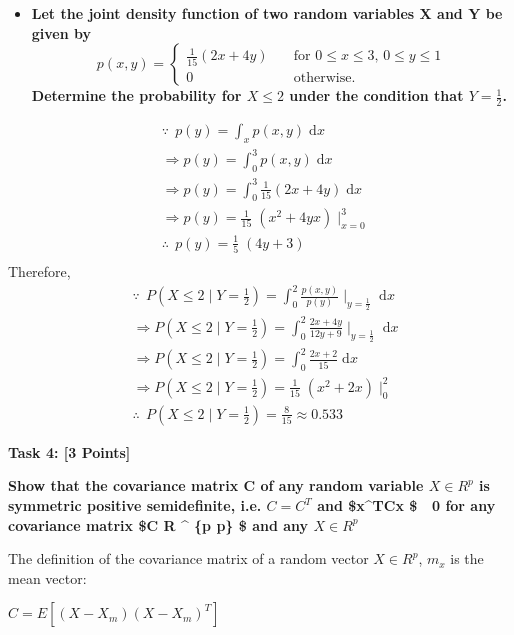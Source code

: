 \documentclass[11pt]{article}
\providecommand{\tightlist}{%
      \setlength{\itemsep}{0pt}\setlength{\parskip}{0pt}}
\begin{document}
    \begin{itemize}
\tightlist
\item
  \textbf{Let the joint density function of two random variables X and Y
  be given by} \[
  p(x, y) = \begin{cases}
  \frac{1}{15}(2x+4y) & \quad \text{for } 0\leq x\leq 3\text{, } 0\leq y\leq 1 \\
  0 & \quad \text{otherwise.} \end{cases}
  \] \textbf{Determine the probability for \(X\leq 2\) under the
  condition that \(Y = \frac{1}{2}\).}
\end{itemize}

    \[
\begin{align*}
& \because \,\; p(y) = \int_x p(x, y)\; \mathrm{d}x\\
& \Rightarrow p(y) = \int_0^3 p(x, y)\; \mathrm{d}x\\
& \Rightarrow p(y) = \int_0^3 \frac{1}{15}(2x+4y)\; \mathrm{d}x\\
& \Rightarrow p(y) = \frac{1}{15}\; (x^2+4yx)\mid_{x=0}^3\\
& \therefore \,\; p(y) = \frac{1}{5}\; (4y+3)\\
\end{align*}
\] Therefore, \[
\begin{align*}
& \because \,\; P(X\leq 2\mid Y=\frac{1}{2}) = \int_0^2 \frac{p(x, y)}{p(y)}\mid_{y=\frac{1}{2}}\; \mathrm{d}x\\
& \Rightarrow P(X\leq 2\mid Y=\frac{1}{2}) = \int_0^2 \frac{2x+4y}{12y+9}\mid_{y=\frac{1}{2}}\; \mathrm{d}x\\
& \Rightarrow P(X\leq 2\mid Y=\frac{1}{2}) = \int_0^2 \frac{2x+2}{15}\; \mathrm{d}x\\
& \Rightarrow P(X\leq 2\mid Y=\frac{1}{2}) = \frac{1}{15}\; (x^2+2x)\mid_0^2\\
& \therefore \,\; P(X\leq 2\mid Y=\frac{1}{2}) = \frac{8}{15} \approx 0.533
\end{align*}
\]

    \textbf{Task 4: {[}3 Points{]}}

\textbf{Show that the covariance matrix C of any random variable
\(X \in R^p\) is symmetric positive semidefinite, i.e. \(C = C^T\) and
\$x\^{}TCx \geq \$  0 for any covariance matrix \$C \in R \^{} \{p
\times p\} \$ and any \(X \in R^p\)}

    The definition of the covariance matrix of a random vector
\(X \in R^p\), \(m_{x}\) is the mean vector:

\(C = E[(X-X_{m})(X-X_{m})^T]\)
\end{document}
